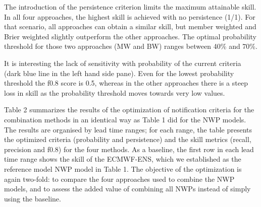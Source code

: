 \documentclass[preprint,12pt]{elsarticle}
\begin{document}
The introduction of the persistence criterion limits the maximum attainable skill. In all four approaches, the highest skill is achieved with no persistence (1/1). For that scenario, all approaches can obtain a similar skill, but member weighted and Brier weighted  slightly outperform the other approaches. The optimal probability threshold for those two approaches (MW and BW) ranges between 40\% and 70\%.

It is interesting the lack of sensitivity with probability of the current criteria (dark blue line in the left hand side pane). Even for the lowest probability threshold the f0.8 score is 0.5, whereas in the other approaches there is a steep loss in skill as the probability threshold moves towards very low values.

Table 2 summarizes the results of the optimization of notification criteria for the combination methods in an identical way as Table 1 did for the NWP models. The results are organised by lead time ranges; for each range, the table presents the optimized criteria (probability and persistence) and the skill metrics (recall, precision and f0.8) for the four methods. As a baseline, the first row in each lead time range shows the skill of the ECMWF-ENS, which we established as the reference model NWP model in Table 1. The objective of the optimization is again two-fold: to compare the four approaches used to combine the NWP models, and to assess the added value of combining all NWPs instead of simply using the baseline. 
\end{document}
